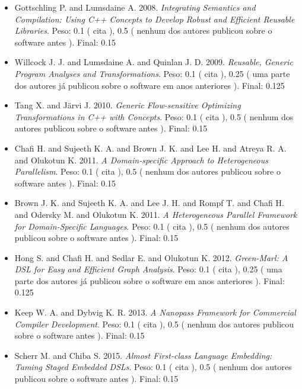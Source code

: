 \begin{itemize}
\item Gottschling P. and Lumsdaine A.
      2008.
        \textit{ Integrating Semantics and Compilation: Using C++ Concepts to Develop Robust and Efficient Reusable Libraries}.
      Peso:
      0.1 (
          cita
      ),
      0.5 (
nenhum dos autores publicou sobre o software antes
      ).
      Final:
      0.15

\item Willcock J. J. and Lumsdaine A. and Quinlan J. D.
      2009.
        \textit{ Reusable, Generic Program Analyses and Transformations}.
      Peso:
      0.1 (
          cita
      ),
      0.25 (
uma parte dos autores já publicou sobre o software em anos anteriores
      ).
      Final:
      0.125

\item Tang X. and J\"{a}rvi J.
      2010.
        \textit{ Generic Flow-sensitive Optimizing Transformations in C++ with Concepts}.
      Peso:
      0.1 (
          cita
      ),
      0.5 (
nenhum dos autores publicou sobre o software antes
      ).
      Final:
      0.15

\item Chafi H. and Sujeeth K. A. and Brown J. K. and Lee H. and Atreya R. A. and Olukotun K.
      2011.
        \textit{ A Domain-specific Approach to Heterogeneous Parallelism}.
      Peso:
      0.1 (
          cita
      ),
      0.5 (
nenhum dos autores publicou sobre o software antes
      ).
      Final:
      0.15

\item Brown J. K. and Sujeeth K. A. and Lee J. H. and Rompf T. and Chafi H. and Odersky M. and Olukotun K.
      2011.
        \textit{ A Heterogeneous Parallel Framework for Domain-Specific Languages}.
      Peso:
      0.1 (
          cita
      ),
      0.5 (
nenhum dos autores publicou sobre o software antes
      ).
      Final:
      0.15

\item Hong S. and Chafi H. and Sedlar E. and Olukotun K.
      2012.
        \textit{ Green-Marl: A DSL for Easy and Efficient Graph Analysis}.
      Peso:
      0.1 (
          cita
      ),
      0.25 (
uma parte dos autores já publicou sobre o software em anos anteriores
      ).
      Final:
      0.125

\item Keep W. A. and Dybvig K. R.
      2013.
        \textit{ A Nanopass Framework for Commercial Compiler Development}.
      Peso:
      0.1 (
          cita
      ),
      0.5 (
nenhum dos autores publicou sobre o software antes
      ).
      Final:
      0.15

\item Scherr M. and Chiba S.
      2015.
        \textit{ Almost First-class Language Embedding: Taming Staged Embedded DSLs}.
      Peso:
      0.1 (
          cita
      ),
      0.5 (
nenhum dos autores publicou sobre o software antes
      ).
      Final:
      0.15

\end{itemize}

